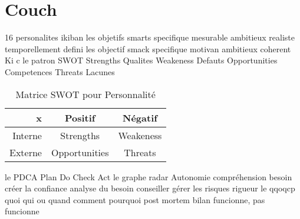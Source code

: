 \documentclass{article}
\begin{document}
\section{Couch}
16 personalites
ikiban
les objetifs smarts
    specifique
    mesurable
    ambitieux
    realiste
    temporellement defini
les objectif smack
    specifique
    motivan
    ambitieux
    coherent
    Ki c le patron
SWOT
    Strengths Qualites
    Weakeness Defauts
    Opportunities Competences
    Threats Lacunes
    \begin{table}[H]
        \centering\begin{tabular}{r|c|c}
            x       & Positif       & Négatif  \\\hline
            Interne & Strengths     & Weakeness\\\hline
            Externe & Opportunities & Threats  \\\hline
        \end{tabular}
        \caption{Matrice SWOT pour Personnalité}
        \label{tab:SWOTcouch}
    \end{table}
le PDCA
    Plan
    Do
    Check
    Act
le graphe radar
    Autonomie
    compréhension besoin
    créer la confiance
    analyse du besoin
    conseiller
    gérer les risques
    rigueur
le qqoqcp
    quoi
    qui
    ou
    quand
    comment
    pourquoi
post mortem
    bilan
    funcionne, pas funcionne
\end{document}

